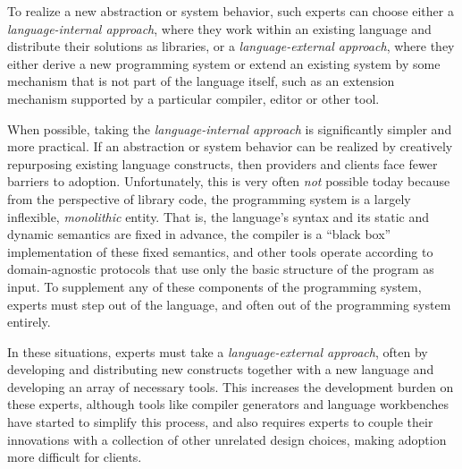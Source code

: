 To realize a new abstraction or system behavior, such experts can choose either a \emph{language-internal approach}, where they work within an existing language and distribute their solutions as libraries, or a \emph{language-external approach}, where they either derive a new programming system or extend an existing system by some mechanism that is not part of the language itself, such as an extension mechanism supported by a {particular} compiler, editor or other tool.

When possible, taking the \emph{language-internal approach} is significantly simpler and more practical. If an abstraction or system behavior can be realized by creatively repurposing existing language constructs, then  providers and clients face fewer barriers to adoption. %
Unfortunately, this is very often \emph{not} possible today because from the perspective of library code, the programming system is a largely inflexible, \emph{monolithic} entity. That is, the language's syntax and its static and dynamic semantics are fixed in advance, the compiler is a ``black box'' implementation of these fixed semantics, and other tools operate according to domain-agnostic protocols that use only the basic structure of the program as input. To supplement any of these components of the programming system, experts must step out of the language, and often out of the programming system entirely. 

In these situations, experts must take a \emph{language-external approach}, often by developing and distributing new constructs together with a new language and developing an array of necessary tools. This increases the development burden on these experts, although tools like compiler generators and language workbenches have started to simplify this process, and also requires experts to couple their innovations with a collection of other unrelated design choices, making adoption more difficult for clients. 

